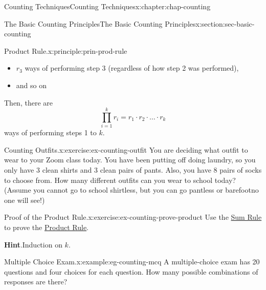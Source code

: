 \documentclass[oneside,10pt,]{book}
\newcommand{\blocktitlefont}{\relax}
\numberwithin{equation}{section}
\begin{document}
\begin{chapterptx}{Counting Techniques}{}{Counting Techniques}{}{}{x:chapter:chap-counting}
\begin{sectionptx}{The Basic Counting Principles}{}{The Basic Counting Principles}{}{}{x:section:sec-basic-counting}
\begin{principle}{Product Rule.}{}{x:principle:prin-prod-rule}
\begin{itemize}[label=\textbullet]
\item{}\(r_3\) ways of performing step 3 (regardless of how step 2 was performed),%
\item{}and so on\textellipsis{}%
\end{itemize}
Then, there are%
\begin{equation*}
\prod_{i=1}^k r_i = r_1 \cdot r_2 \cdot \ldots \cdot r_k
\end{equation*}
ways of performing steps 1 to \(k\).%
\end{principle}
\begin{inlineexercise}{Counting Outfits.}{x:exercise:ex-counting-outfit}%
You are deciding what outfit to wear to your Zoom class today. You have been putting off doing laundry, so you only have 3 clean shirts and 3 clean pairs of pants. Also, you have 8 pairs of socks to choose from. How many different outfits can you wear to school today? (Assume you cannot go to school shirtless, but you can go pantless or barefoot\textemdash{}no one will see!)%
\end{inlineexercise}
\begin{inlineexercise}{Proof of the Product Rule.}{x:exercise:ex-counting-prove-product}%
Use the \hyperref[x:principle:prin-sum-rule]{Sum Rule} to prove the \hyperref[x:principle:prin-prod-rule]{Product Rule}.%
\par\smallskip%
\noindent\textbf{\blocktitlefont Hint}.\hypertarget{g:hint:id473865}{}\quad{}Induction on \(k\).%
\end{inlineexercise}
\begin{example}{Multiple Choice Exam.}{x:example:eg-counting-mcq}%
A multiple-choice exam has 20 questions and four choices for each question. How many possible combinations of responses are there?%
\begin{sidebyside}{1}{0.35}{0.35}{0}%
\begin{sbspanel}{0.3}%

\end{sbspanel}
\end{sidebyside}
\end{example}
\end{sectionptx}
\end{chapterptx}
\end{document}
